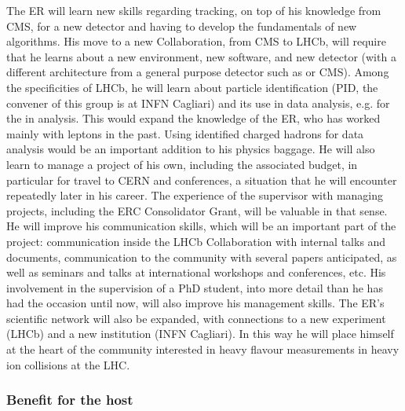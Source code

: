 \documentclass[a4paper,11pt]{article}
\newcommand{\ER}{ER\xspace}
\newcommand{\supervisor}{the supervisor\xspace}
\begin{document}
The \ER will learn new skills regarding tracking, on top of his knowledge from CMS, for a new detector and having to develop the fundamentals of new algorithms. His move to a new Collaboration, from CMS to LHCb, will require that he learns about a new environment, new software, and new detector (with a different architecture from a general purpose detector such as \DO or CMS). 
%
Among the specificities of LHCb, he will learn about particle identification (PID, the convener of this group is at INFN Cagliari) and its use in data analysis, e.g. for the \Dz in \pbpb analysis. 
This would expand the knowledge of the \ER, who has worked mainly with leptons in the past. Using identified charged hadrons for data analysis would be an important addition to his physics baggage.
%
He will also learn to manage a project of his own, including the associated budget, in particular for travel to CERN and conferences, a situation that he will encounter repeatedly later in his career. The experience of \supervisor with managing projects, including the ERC Consolidator Grant, will be valuable in that sense.
%
He will improve his communication skills, which will be an important part of the project: communication inside the LHCb Collaboration with internal talks and documents, communication to the community with several papers anticipated, as well as seminars and talks at international workshops and conferences, etc. His involvement in the supervision of a PhD student, into more detail than he has had the occasion until now, will also improve his management skills.
%
The \ER's scientific network will also be expanded, with connections to a new experiment (LHCb) and a new institution (INFN Cagliari). In this way he will place himself at the heart of the community interested in heavy flavour measurements in heavy ion collisions at the LHC.



\subsubsection{Benefit for the host}
\end{document}
